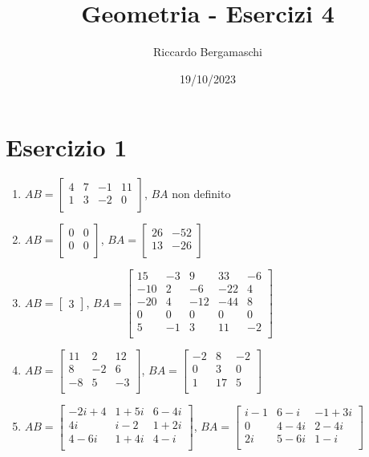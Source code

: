 \documentclass{article}
\title{Geometria - Esercizi 4}
\author{Riccardo Bergamaschi}
\date{19/10/2023}
\begin{document}
\maketitle
\section*{Esercizio 1}
\begin{enumerate}
    \item $AB=\begin{bmatrix}
        4 & 7 & -1 & 11 \\
        1 & 3 & -2 & 0 \\
    \end{bmatrix}$, $BA$ non definito
    \item $AB=\begin{bmatrix}
        0 & 0 \\
        0 & 0 \\
    \end{bmatrix}$, $BA=\begin{bmatrix}
        26 & -52 \\
        13 & -26 \\
    \end{bmatrix}$
    \item $AB=\begin{bmatrix}3\end{bmatrix}$, $BA=\begin{bmatrix}
        15 & -3 & 9 & 33 & -6 \\
        -10 & 2 & -6 & -22 & 4 \\
        -20 & 4 & -12 & -44 & 8 \\
        0 & 0 & 0 & 0 & 0 \\
        5 & -1 & 3 & 11 & -2 \\
    \end{bmatrix}$
    \item $AB=\begin{bmatrix}
        11 & 2 & 12 \\
        8 & -2 & 6 \\
        -8 & 5 & -3 \\
    \end{bmatrix}$, $BA=\begin{bmatrix}
        -2 & 8 & -2 \\
        0 & 3 & 0 \\
        1 & 17 & 5 \\
    \end{bmatrix}$
    \item $AB=\begin{bmatrix}
        -2i+4 & 1+5i & 6-4i \\
        4i & i-2 & 1+2i \\
        4-6i & 1+4i & 4-i \\
    \end{bmatrix}$, $BA=\begin{bmatrix}
        i-1 & 6-i & -1+3i \\
        0 & 4-4i & 2-4i \\
        2i & 5-6i & 1-i \\
    \end{bmatrix}$
\end{enumerate}
\end{document}
